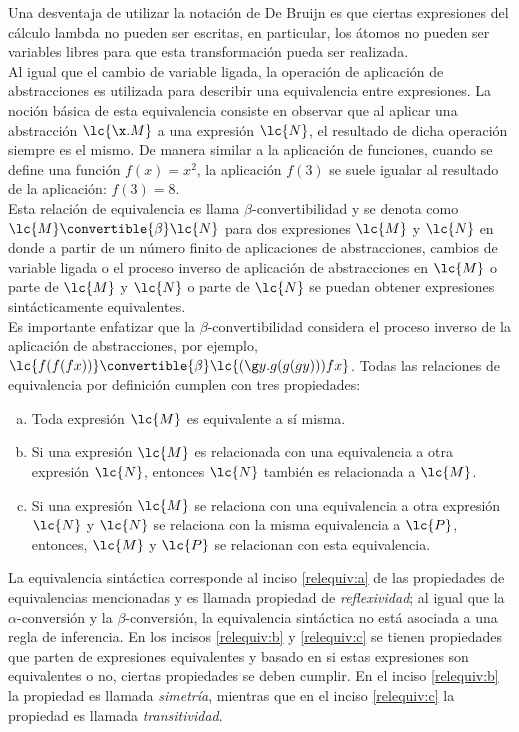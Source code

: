 Una desventaja de utilizar la notación de De Bruijn es que ciertas expresiones
del cálculo lambda no pueden ser escritas, en particular, los átomos no pueden
ser variables libres para que esta transformación pueda ser realizada. \\

Al igual que el cambio de variable ligada, la operación de aplicación de
abstracciones es utilizada para describir una equivalencia entre expresiones. La
noción básica de esta equivalencia consiste en observar que al aplicar una
abstracción \(\lc{\x.M}\) a una expresión \(\lc{N}\), el resultado de dicha
operación siempre es el mismo. De manera similar a la aplicación de funciones,
cuando se define una función \(f(x)=x^{2}\), la aplicación \(f(3)\) se suele
igualar al resultado de la aplicación: \(f(3) = 8\). \\

Esta relación de equivalencia es llama \(\beta\)-convertibilidad y se denota
como \(\lc{M} \convertible{\beta} \lc{N}\) para dos expresiones \(\lc{M}\) y
\(\lc{N}\) en donde a partir de un número finito de aplicaciones de
abstracciones, cambios de variable ligada o el proceso inverso de aplicación de
abstracciones en \(\lc{M}\) o parte de \(\lc{M}\) y \(\lc{N}\) o parte de
\(\lc{N}\) se puedan obtener expresiones sintácticamente equivalentes. \\

Es importante enfatizar que la \(\beta\)-convertibilidad considera el proceso
inverso de la aplicación de abstracciones, por ejemplo, \(\lc{f(f(f x))}
\convertible{\beta} \lc{(\g y.g(g(g y)))f x}\). Todas las relaciones de
equivalencia por definición cumplen con tres propiedades:

\begin{enumerate}[a.]
\item Toda expresión \(\lc{M}\) es equivalente a sí misma. \label{relequiv:a}
\item Si una expresión \(\lc{M}\) es relacionada con una equivalencia a otra
  expresión \(\lc{N}\), entonces \(\lc{N}\) también es relacionada a \(\lc{M}\). \label{relequiv:b}
\item Si una expresión \(\lc{M}\) se relaciona con una equivalencia a otra
  expresión \(\lc{N}\) y \(\lc{N}\) se relaciona con la misma equivalencia a
  \(\lc{P}\), entonces, \(\lc{M}\) y \(\lc{P}\) se relacionan con esta
  equivalencia. \label{relequiv:c}
\end{enumerate}

La equivalencia sintáctica corresponde al inciso \ref{relequiv:a} de las
propiedades de equivalencias mencionadas y es llamada propiedad de
\emph{reflexividad}; al igual que la \(\alpha\)-conversión y la
\(\beta\)-conversión, la equivalencia sintáctica no está asociada a una regla de
inferencia. En los incisos \ref{relequiv:b} y \ref{relequiv:c} se tienen
propiedades que parten de expresiones equivalentes y basado en si estas
expresiones son equivalentes o no, ciertas propiedades se deben cumplir. En el
inciso \ref{relequiv:b} la propiedad es llamada \emph{simetría}, mientras que en el
inciso \ref{relequiv:c} la propiedad es llamada \emph{transitividad}. \\

